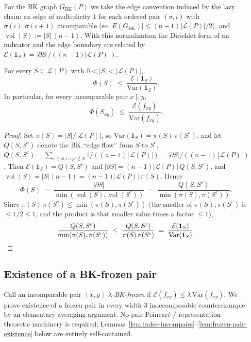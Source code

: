 For the BK graph $G_{\mathrm{BK}}(P)$ we take the edge
convention induced by the lazy chain: an edge of multiplicity $1$ for
each ordered pair $(\sigma, i)$ with $\sigma(i), \sigma(i+1)$
incomparable (so $|E(G_{\mathrm{BK}})| \le (n-1)|\mathcal L(P)|/2$), and
$\operatorname{vol}(S) := |S|\,(n-1)$. With this normalization the
Dirichlet form of an indicator and the edge boundary are related by
$\mathcal{E}(\mathbf 1_S) = |\partial S| / ((n-1)|\mathcal L(P)|)$.

\begin{lemma}
\label{lem:dirichlet-conductance}
For every $S \subseteq \mathcal L(P)$ with $0 < |S| < |\mathcal L(P)|$,
\[
  \Phi(S) \;\le\;
  \frac{\mathcal{E}(\mathbf 1_S)}{\mathrm{Var}(\mathbf 1_S)}.
\]
In particular, for every incomparable pair $x \parallel y$,
\[
  \Phi(S_{xy}) \;\le\;
  \frac{\mathcal{E}(f_{xy})}{\mathrm{Var}(f_{xy})}.
\]
\end{lemma}

\begin{proof}
Set $\pi(S) = |S|/|\mathcal L(P)|$, so
$\mathrm{Var}(\mathbf 1_S) = \pi(S)\,\pi(S^c)$, and let
$Q(S, S^c)$ denote the BK ``edge flow'' from $S$ to $S^c$,
$Q(S,S^c) = \sum_{\sigma \in S, i : \tau_i \sigma \notin S}
1/((n-1)\,|\mathcal L(P)|) = |\partial S| / ((n-1)\,|\mathcal L(P)|)$.
Then $\mathcal{E}(\mathbf 1_S) = Q(S,S^c)$ and
$|\partial S| = (n-1)|\mathcal L(P)|\,Q(S,S^c)$, and
$\operatorname{vol}(S) = |S|(n-1) = (n-1)|\mathcal L(P)|\,\pi(S)$.
Hence
\[
  \Phi(S) \;=\; \frac{|\partial S|}{\min(\operatorname{vol}(S),
  \operatorname{vol}(S^c))}
  \;=\; \frac{Q(S,S^c)}{\min(\pi(S),\pi(S^c))}.
\]
Since $\pi(S)\,\pi(S^c) \le \min(\pi(S), \pi(S^c))$ (the smaller
of $\pi(S), \pi(S^c)$ is $\le 1/2 \le 1$, and the product is that
smaller value times a factor $\le 1$),
\[
  \frac{Q(S,S^c)}{\min(\pi(S),\pi(S^c))}
  \;\le\;
  \frac{Q(S,S^c)}{\pi(S)\,\pi(S^c)}
  \;=\; \frac{\mathcal{E}(\mathbf 1_S)}{\mathrm{Var}(\mathbf 1_S)}. \qedhere
\]
\end{proof}

\subsection{Existence of a BK-frozen pair}

Call an incomparable pair $(x, y)$ \emph{$\lambda$-BK-frozen} if
$\mathcal{E}(f_{xy}) \le \lambda\,\mathrm{Var}(f_{xy})$. We prove
existence of a frozen pair in every width-$3$ indecomposable
counterexample by an elementary averaging argument. No
pair-Poincar\'e / representation-theoretic machinery is required;
Lemmas~\ref{lem:indec-incompairs}--\ref{lem:frozen-pair-existence}
below are entirely self-contained.

